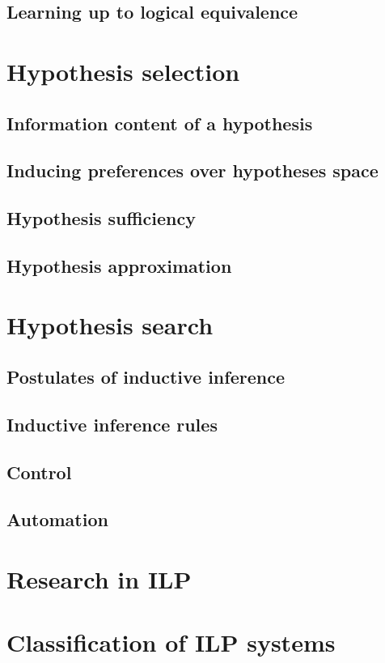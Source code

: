 \subsection{Learning up to logical equivalence}
\section{Hypothesis selection}
\subsection{Information content of a hypothesis}
\subsection{Inducing preferences over hypotheses space}
\subsection{Hypothesis sufficiency}
\subsection{Hypothesis approximation}
\section{Hypothesis search}
\subsection{Postulates of inductive inference}
\subsection{Inductive inference rules}
\subsection{Control}
\subsection{Automation}
\section{Research in ILP}
\section{Classification of ILP systems}